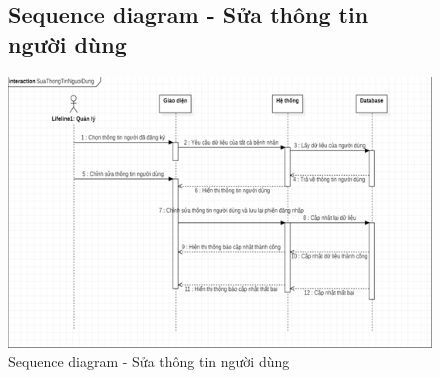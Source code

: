 \documentclass{report}
\begin{document}
\pagebreak
\begin{center}
	\begin{figure}[!htp]
		\subsection{Sequence diagram - Sửa thông tin người dùng}
		\begin{center}
			\includegraphics[scale=1]{Hinh/Sequence diagram Sửa thông tin người dùng.png}
		\end{center}
		\caption{Sequence diagram - Sửa thông tin người dùng}
	\end{figure}
\end{center}

\pagebreak
\end{document}

